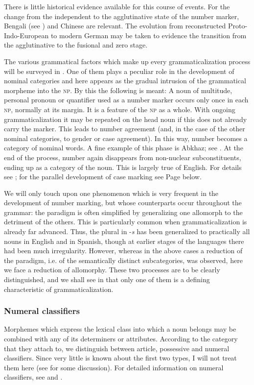 There is little historical evidence available for this course of events. For the change from the independent to the agglutinative state of the number marker, Bengali (see \citealt{Kölver1982a}) and Chinese are relevant. The evolution from reconstructed Proto-Indo-European to modern German may be taken to evidence the transition from the agglutinative to the fusional and zero stage.

\label{page63}The various grammatical factors which make up every grammaticalization process will be surveyed in . One of them plays a peculiar role in the development of nominal categories and here appears as the gradual intrusion of the grammatical morpheme into the \textsc{np}. By this the following is meant: A noun of multitude, personal pronoun or quantifier used as a number marker occurs only once in each \textsc{np}, normally at its margin. It is a feature of the \textsc{np} as a whole. With ongoing grammaticalization it may be repeated on the head noun if this does not already carry the marker. This leads to number agreement (and, in the case of the other nominal categories, to gender or case agreement). In this way, number becomes a category of nominal words. A fine example of this phase is Abkhaz; see \citet[222f]{Hewitt1979}. At the end of the process, number again disappears from non-nuclear subconstituents, ending up as a category of the noun. This is largely true of English. For details see \citealt[§~6.3]{Lehmann1982b}; for the parallel development of case marking see Page \pageref{page92}\chk%
  below.

We will only touch upon one phenomenon which is very frequent in the development of number marking, but whose counterparts occur throughout the grammar: the paradigm is often simplified by generalizing one allomorph to the detriment of the others. This is particularly common when grammaticalization is already far advanced. Thus, the plural in -\textit{s} has been generalized to practically all nouns in English and in Spanish, though at earlier stages of the languages there had been much irregularity. However, whereas in the above cases a reduction of the paradigm, i.e. of the semantically distinct subcategories, was observed, here we face a reduction of allomorphy. These two processes are to be clearly distinguished, and we shall see in  that only one of them is a defining characteristic of grammaticalization.

\subsubsection{Numeral classifiers}
Morphemes which express the lexical class into which a noun belongs may be combined with any of its determiners or attributes. According to the category that they attach to, we distinguish between article, possessive and numeral classifiers. Since very little is known about the first two types, I will not treat them here (see \citealt[§~6.3.3]{Lehmann1982b} for some discussion). For detailed information on numeral classifiers, see \citealt{Kölver1982b} and \citealt{Serzisko1980,Serzisko1982}.

